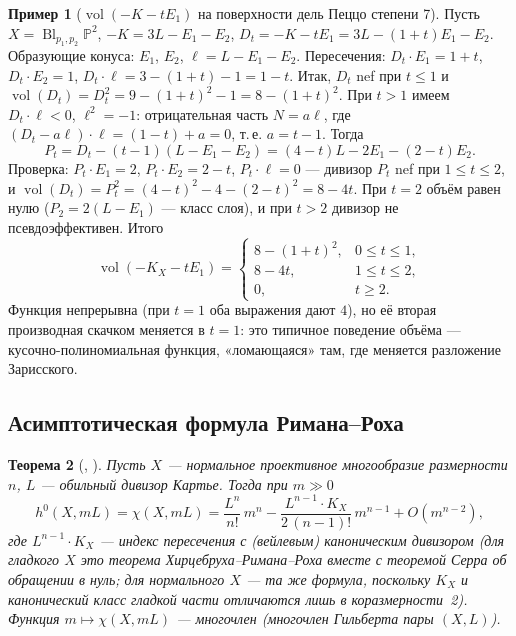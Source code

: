 \documentclass[11pt,a4paper]{article}
\theoremstyle{plain}
\newtheorem{theorem}{Теорема}[section]
\theoremstyle{definition}
\newtheorem{example}[theorem]{Пример}
\theoremstyle{remark}
\newcommand{\PP}{\mathbb{P}}
\DeclareMathOperator{\Bl}{Bl}
\DeclareMathOperator{\vol}{vol}
\begin{document}
\begin{example}[$\vol(-K-tE_1)$ на поверхности дель Пеццо степени 7]\label{ex:vol-dP7}
Пусть $X=\Bl_{p_1,p_2}\PP^2$, $-K=3L-E_1-E_2$, $D_t=-K-tE_1=3L-(1+t)E_1-E_2$. Образующие конуса:
$E_1$, $E_2$, $\ell=L-E_1-E_2$. Пересечения: $D_t\cdot E_1=1+t$, $D_t\cdot E_2=1$,
$D_t\cdot\ell=3-(1+t)-1=1-t$. Итак, $D_t$ nef при $t\le1$ и $\vol(D_t)=D_t^2=9-(1+t)^2-1=8-(1+t)^2$.
При $t>1$ имеем $D_t\cdot\ell<0$, $\ell^2=-1$: отрицательная часть $N=a\ell$, где
$(D_t-a\ell)\cdot\ell=(1-t)+a=0$, т.\,е. $a=t-1$. Тогда
\[
P_t=D_t-(t-1)(L-E_1-E_2)=(4-t)L-2E_1-(2-t)E_2 .
\]
Проверка: $P_t\cdot E_1=2$, $P_t\cdot E_2=2-t$, $P_t\cdot\ell=0$ --- дивизор $P_t$ nef при
$1\le t\le2$, и $\vol(D_t)=P_t^2=(4-t)^2-4-(2-t)^2=8-4t$. При $t=2$ объём равен нулю
($P_2=2(L-E_1)$ --- класс слоя), и при $t>2$ дивизор не псевдоэффективен. Итого
\[
\vol(-K_X-tE_1)=\begin{cases}8-(1+t)^2,&0\le t\le1,\\8-4t,&1\le t\le2,\\0,&t\ge2.\end{cases}
\]
Функция непрерывна (при $t=1$ оба выражения дают $4$), но её вторая производная скачком меняется в
$t=1$: это типичное поведение объёма --- кусочно-полиномиальная функция, «ломающаяся» там, где
меняется разложение Зарисского.
\end{example}

\subsection{Асимптотическая формула Римана--Роха}

\begin{theorem}[{\cite[1.1.24]{La}, \cite[2.1.2]{Xu}}]\label{thm:aRR}
Пусть $X$ --- нормальное проективное многообразие размерности $n$, $L$ --- обильный дивизор
Картье. Тогда при $m\gg0$
\[
h^0(X,mL)=\chi(X,mL)=\frac{L^n}{n!}\,m^n-\frac{L^{n-1}\cdot K_X}{2\,(n-1)!}\,m^{n-1}+O(m^{n-2}),
\]
где $L^{n-1}\cdot K_X$ --- индекс пересечения с (вейлевым) каноническим дивизором
(для гладкого $X$ это теорема Хирцебруха--Римана--Роха вместе с теоремой Серра об обращении в нуль;
для нормального $X$ --- та же формула, поскольку $K_X$ и канонический класс гладкой части
отличаются лишь в коразмерности~2). Функция $m\mapsto\chi(X,mL)$ --- многочлен
(\emph{многочлен Гильберта} пары $(X,L)$).
\end{theorem}
\end{document}
